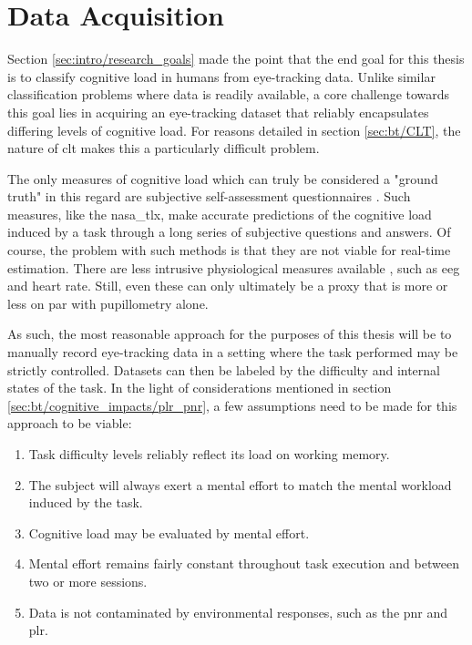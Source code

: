 \section{Data Acquisition} \label{sec:impl/data_acq}

Section \ref{sec:intro/research_goals} made the point that the end goal for this thesis is to classify cognitive load in humans from eye-tracking data. Unlike similar classification problems where data is readily available, a core challenge towards this goal lies in acquiring an eye-tracking dataset that reliably encapsulates differing levels of cognitive load. For reasons detailed in section \ref{sec:bt/CLT}, the nature of \acrshort{clt} makes this a particularly difficult problem. 

The only measures of cognitive load which can truly be considered a "ground truth" in this regard are subjective self-assessment questionnaires \cite{sharma2020, herbig2020}. Such measures, like the \acrshort{nasa_tlx}, make accurate predictions of the cognitive load induced by a task through a long series of subjective questions and answers. Of course, the problem with such methods is that they are not viable for real-time estimation. There are less intrusive physiological measures available \cite{skulmowski2017}, such as \acrshort{eeg} and heart rate. Still, even these can only ultimately be a proxy that is more or less on par with pupillometry alone.

As such, the most reasonable approach for the purposes of this thesis will be to manually record eye-tracking data in a setting where the task performed may be strictly controlled. Datasets can then be labeled by the difficulty and internal states of the task. In the light of considerations mentioned in section \ref{sec:bt/cognitive_impacts/plr_pnr}, a few assumptions need to be made for this approach to be viable:

\begin{enumerate}
    \item Task difficulty levels reliably reflect its load on working memory. \label{itm:Ass1}
    \item The subject will always exert a mental effort to match the mental workload induced by the task. \label{itm:Ass2}
    \item Cognitive load may be evaluated by mental effort. \label{itm:Ass3}
    \item Mental effort remains fairly constant throughout task execution and between two or more sessions. \label{itm:Ass4}
    \item Data is not contaminated by environmental responses, such as the \acrshort{pnr} and \acrshort{plr}. \label{itm:Ass5}
\end{enumerate}

